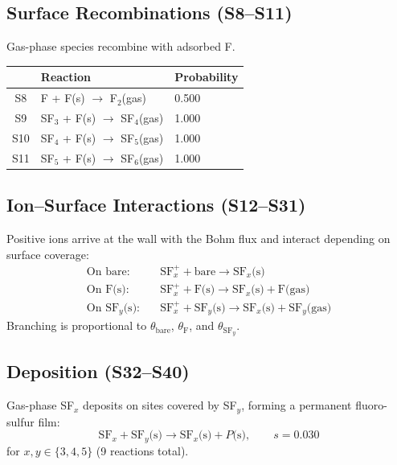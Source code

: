 \documentclass[11pt,a4paper]{article}
\begin{document}
\subsection{Surface Recombinations (S8--S11)}

Gas-phase species recombine with adsorbed F.

\begin{tabular}{cll}
\toprule
& \textbf{Reaction} & \textbf{Probability} \\
\midrule
S8  & F + F(s) $\to$ F$_2$(gas)       & 0.500 \\
S9  & SF$_3$ + F(s) $\to$ SF$_4$(gas) & 1.000 \\
S10 & SF$_4$ + F(s) $\to$ SF$_5$(gas) & 1.000 \\
S11 & SF$_5$ + F(s) $\to$ SF$_6$(gas) & 1.000 \\
\bottomrule
\end{tabular}

\subsection{Ion--Surface Interactions (S12--S31)}

Positive ions arrive at the wall with the Bohm flux and interact depending on surface coverage:
\begin{align}
  \text{On bare:}\quad   & \text{SF}_x^+ + \text{bare} \to \text{SF}_x\text{(s)} \\
  \text{On F(s):}\quad   & \text{SF}_x^+ + \text{F(s)} \to \text{SF}_x\text{(s)} + \text{F(gas)} \\
  \text{On SF}_y\text{(s):}\quad & \text{SF}_x^+ + \text{SF}_y\text{(s)} \to \text{SF}_x\text{(s)} + \text{SF}_y\text{(gas)}
\end{align}
Branching is proportional to $\theta_\text{bare}$, $\theta_\text{F}$, and $\theta_{\text{SF}_y}$.

\subsection{Deposition (S32--S40)}

Gas-phase SF$_x$ deposits on sites covered by SF$_y$, forming a permanent fluoro-sulfur film:
\begin{equation}
  \text{SF}_x + \text{SF}_y\text{(s)} \to \text{SF}_x\text{(s)} + P\text{(s)}, \qquad s = 0.030
\end{equation}
for $x, y \in \{3, 4, 5\}$ (9 reactions total).

\end{document}

